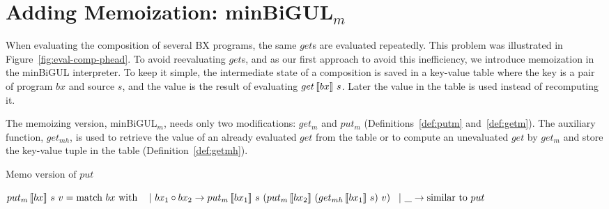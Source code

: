 \section{Adding Memoization: minBiGUL$_m$} \label{sect:minbigulm}

When evaluating the composition of several BX programs, 
the same $get$s are evaluated repeatedly.
This problem was illustrated in Figure~\ref{fig:eval-comp-phead}. To avoid reevaluating $get$s, and as our first approach to avoid this inefficiency, we introduce memoization in the minBiGUL interpreter.
To keep it simple, the intermediate state of a composition is saved in a key-value table where the key is a pair of program $bx$ and source $s$, and the value is the result of evaluating $get \, [\![bx]\!] \ s$.
Later the value in the table is used instead of recomputing it. 

The memoizing version, minBiGUL$_m$, needs only two modifications: $get_m$ and $put_m$ (Definitions~\ref{def:putm} and~\ref{def:getm}). The auxiliary function, $get_{mh}$, is used to retrieve the value of an already evaluated $get$ from the table or to compute an unevaluated $get$ by $get_m$ and store the key-value tuple in the table (Definition~\ref{def:getmh}).

\begin{definition} \label{def:putm} $\text{Memo version of } put$

    \noindent $\putm{bx}{s}{v} = \text{match } bx \text{ with }\\
        \tab \vert \ bx_1 \circ bx_2 \to \putm{bx_1}{s}{(\putm{bx_2}{(\getmh{bx_1}{s})}{v})} \\
        \tab \vert \ \_ \to \text{similar to } put$
\end{definition}

